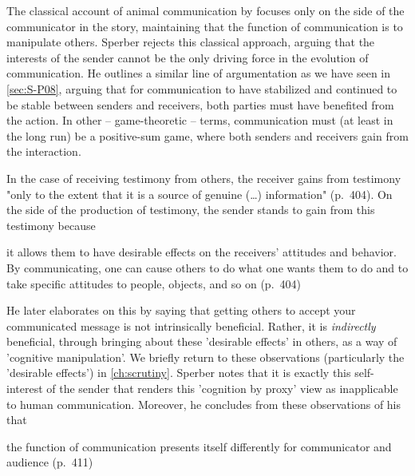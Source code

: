 The classical account of animal communication by \citet{DawkinsKrebs78} focuses only on the side of the communicator in the story, maintaining that the function of communication is to manipulate others. Sperber rejects this classical approach, arguing that the interests of the sender cannot be the only driving force in the evolution of communication.
He outlines a similar line of argumentation as we have seen in \cref{sec:S-P08},
arguing that for communication to have stabilized and continued to be stable between senders and receivers, both parties must have benefited from the action. In other -- game-theoretic -- terms, communication must (at least in the long run) be a positive-sum game, where both senders and receivers gain from the interaction.

In the case of receiving testimony from others, the receiver gains from testimony "only to the extent that it is a source of genuine (\ldots) information" (p.~404).
On the side of the production of testimony, the sender stands to gain from this testimony because
\begin{quoting}
    it allows them to have desirable effects on the receivers' attitudes and behavior. By communicating, one can cause others to do what one wants them to do and to take specific attitudes to people, objects, and so on
    \hfill (p.~404)
\end{quoting}
He later elaborates on this by saying that getting others to accept your communicated message is not intrinsically beneficial. Rather, it is \emph{indirectly} beneficial, through bringing about these 'desirable effects' in others, as a way of 'cognitive manipulation'.
We briefly return to these observations (particularly the 'desirable effects') in \cref{ch:scrutiny}.
Sperber notes that it is exactly this self-interest of the sender that renders this 'cognition by proxy' view as inapplicable to human communication.
Moreover, he concludes from these observations of his that
\begin{quoting}
    the function of communication presents itself differently for communicator and audience
    \hfill (p.~411)
\end{quoting}

